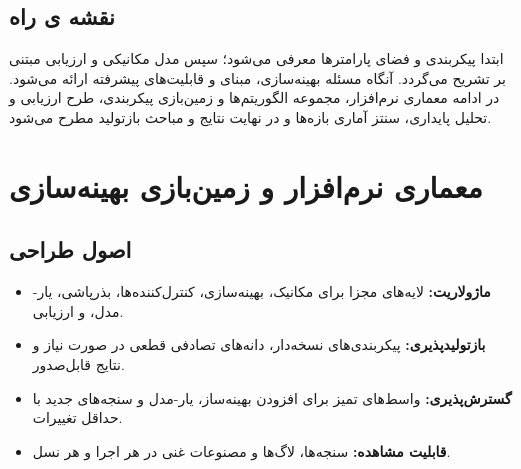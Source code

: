 \subsection{نقشه ی راه}
\label{subsec:roadmap}
ابتدا پیکربندی  و فضای پارامترها معرفی می‌شود؛ سپس مدل مکانیکی و ارزیابی مبتنی بر  تشریح می‌گردد. آنگاه مسئله بهینه‌سازی، مبنای  و قابلیت‌های پیشرفته ارائه می‌شود. در ادامه معماری نرم‌افزار، مجموعه الگوریتم‌ها و زمین‌بازی پیکربندی، طرح ارزیابی و تحلیل پایداری، سنتز آماری بازه‌ها و در نهایت نتایج و مباحث بازتولید مطرح می‌شود.

\section{معماری نرم‌افزار و زمین‌بازی بهینه‌سازی}
\label{sec:architecture}

\subsection{اصول طراحی}
\begin{itemize}
    \item \textbf{ماژولاریت:} لایه‌های مجزا برای مکانیک، بهینه‌سازی، کنترل‌کننده‌ها، بذرپاشی، یار-مدل،  و ارزیابی.
    \item \textbf{بازتولیدپذیری:} پیکربندی‌های نسخه‌دار، دانه‌های تصادفی قطعی در صورت نیاز و نتایج قابل‌صدور.
    \item \textbf{گسترش‌پذیری:} واسط‌های تمیز برای افزودن بهینه‌ساز، یار-مدل و سنجه‌های جدید با حداقل تغییرات.
    \item \textbf{قابلیت مشاهده:} سنجه‌ها، لاگ‌ها و مصنوعات غنی در هر اجرا و هر نسل.
\end{itemize}

